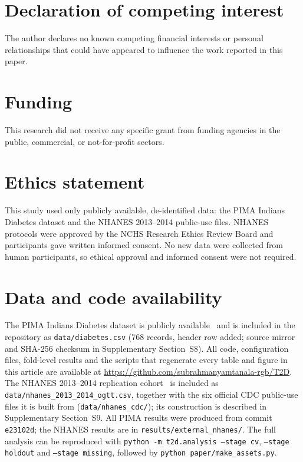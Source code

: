 \documentclass[preprint,12pt,authoryear=false]{elsarticle}
\begin{document}
\section*{Declaration of competing interest}
The author declares no known competing financial interests or personal relationships that could have appeared to influence the work reported in this paper.

\section*{Funding}
This research did not receive any specific grant from funding agencies in the public, commercial, or not-for-profit sectors.

\section*{Ethics statement}
This study used only publicly available, de-identified data: the PIMA Indians Diabetes dataset and the NHANES 2013--2014 public-use files. NHANES protocols were approved by the NCHS Research Ethics Review Board and participants gave written informed consent. No new data were collected from human participants, so ethical approval and informed consent were not required.

\section*{Data and code availability}
The PIMA Indians Diabetes dataset is publicly available~\cite{pimadata} and is included in the repository as \texttt{data/diabetes.csv} (768 records, header row added; source mirror and SHA-256 checksum in Supplementary Section~S8). All code, configuration files, fold-level results and the scripts that regenerate every table and figure in this article are available at \url{https://github.com/subrahmanyamtanala-rgb/T2D}. %
The NHANES 2013--2014 replication cohort~\cite{nhanes2013} is included as \texttt{data/nhanes\_2013\_2014\_ogtt.csv}, together with the six official CDC public-use files it is built from (\texttt{data/nhanes\_cdc/}); its construction is described in Supplementary Section~S9. All PIMA results were produced from commit \texttt{e23102d}; the NHANES results are in \texttt{results/external\_nhanes/}. The full analysis can be reproduced with \texttt{python -m t2d.analysis --stage cv}, \texttt{--stage holdout} and \texttt{--stage missing}, followed by \texttt{python paper/make\_assets.py}.
\end{document}
